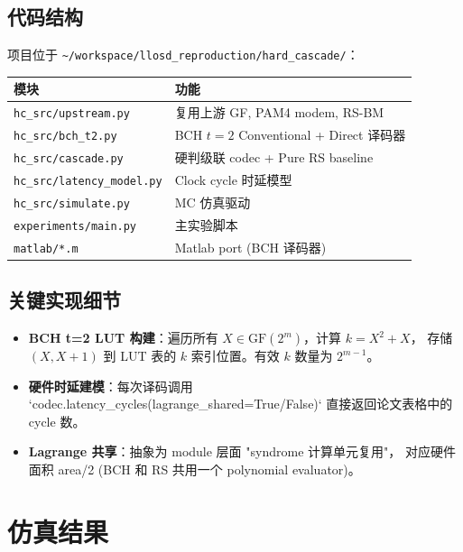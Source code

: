 \documentclass[11pt,a4paper]{article}
\begin{document}
\subsection{代码结构}

项目位于 \texttt{\textasciitilde/workspace/llosd\_reproduction/hard\_cascade/}：

\begin{center}
\begin{tabular}{ll}
\toprule
\textbf{模块} & \textbf{功能} \\
\midrule
\texttt{hc\_src/upstream.py}       & 复用上游 GF, PAM4 modem, RS-BM \\
\texttt{hc\_src/bch\_t2.py}        & BCH $t=2$ Conventional + Direct 译码器 \\
\texttt{hc\_src/cascade.py}        & 硬判级联 codec + Pure RS baseline \\
\texttt{hc\_src/latency\_model.py} & Clock cycle 时延模型 \\
\texttt{hc\_src/simulate.py}       & MC 仿真驱动 \\
\texttt{experiments/main.py}       & 主实验脚本 \\
\texttt{matlab/*.m}                & Matlab port (BCH 译码器) \\
\bottomrule
\end{tabular}
\end{center}

\subsection{关键实现细节}

\begin{itemize}[leftmargin=1.5em, itemsep=1pt]
\item \textbf{BCH t=2 LUT 构建}：遍历所有 $X \in \text{GF}(2^m)$，计算 $k = X^2 + X$，
    存储 $(X, X+1)$ 到 LUT 表的 $k$ 索引位置。有效 $k$ 数量为 $2^{m-1}$。
\item \textbf{硬件时延建模}：每次译码调用 `codec.latency\_cycles(lagrange\_shared=True/False)`
    直接返回论文表格中的 cycle 数。
\item \textbf{Lagrange 共享}：抽象为 module 层面 "syndrome 计算单元复用"，
    对应硬件面积 area/2 (BCH 和 RS 共用一个 polynomial evaluator)。
\end{itemize}

\section{仿真结果}
\end{document}
